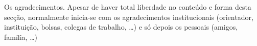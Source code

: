 \acknowledgements

Os agradecimentos. Apesar de haver total liberdade no conteúdo e forma desta secção, normalmente inicia-se com os agradecimentos institucionais (orientador, instituição, bolsas, colegas de trabalho, \ldots) e só depois os pessoais (amigos, família, \ldots)